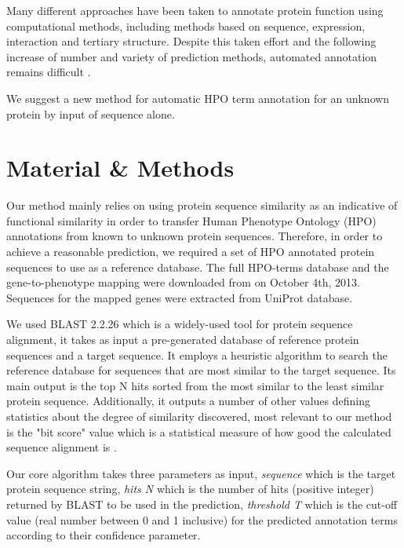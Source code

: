 \documentclass{bioinfo}
\begin{document}
Many different approaches have been taken to annotate protein function using computational methods, including methods based on sequence, expression, interaction and tertiary structure. Despite this taken effort and the following increase of number and variety of prediction methods, automated annotation remains difficult \citep{Rodrigues07}.

We suggest a new method for automatic HPO term annotation for an unknown protein by input of sequence alone.

\section{Material \& Methods}

Our method mainly relies on using protein sequence similarity as an indicative of functional similarity in order to transfer Human Phenotype Ontology (HPO) annotations from known to unknown protein sequences. Therefore, in order to achieve a reasonable prediction, we required a set of HPO annotated protein sequences to use as a reference database. The full HPO-terms database and the gene-to-phenotype mapping were downloaded from \cite{hpodb} on October 4th, 2013. Sequences for the mapped genes were extracted from UniProt \cite{uniprot} database.

We used BLAST 2.2.26 \cite{blastweb} which is a widely-used tool for protein sequence alignment, it takes as input a pre-generated database of reference protein sequences and a target sequence. It employs a heuristic algorithm to search the reference database for sequences that are most similar to the target sequence. Its main output is the top N hits sorted from the most similar to the least similar protein sequence. Additionally, it outputs a number of other values defining statistics about the degree of similarity discovered, most relevant to our method is the "bit score" value which is a statistical measure of how good the calculated sequence alignment is \cite{blastscore}.

Our core algorithm takes three parameters as input, \textit{sequence} which is the target protein sequence string, \textit{hits N} which is the number of hits (positive integer) returned by BLAST to be used in the prediction, \textit{threshold T} which is the cut-off value (real number between 0 and 1 inclusive) for the predicted annotation terms according to their confidence parameter.
\end{document}
